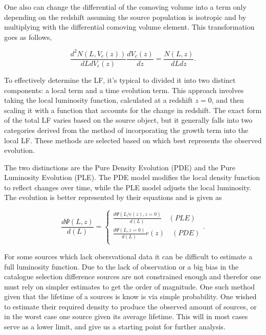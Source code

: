 One also can change the differential of the comoving volume into a term only depending on the redshift assuming the source population is isotropic and by multiplying with the differential comoving volume element. This 
transformation goes as follows, 

\begin{equation}
    \frac{d^2N(L,V_c(z))}{dLdV_c(z)}\frac{dV_c(z)}{dz} = \frac{N(L,z)}{dLdz}.
\end{equation}


To effectively determine the LF, it's typical to divided it into two distinct components: a local term and a time evolution term.
 This approach involves taking the local luminosity function, calculated at a redshift 
$z=0$, and then scaling it with a function that accounts for the change in redshift. 
The exact form of the total LF varies based on the source object, but it generally falls into two categories derived from the method of incorporating the growth term into the local LF.
 These methods are selected based on which best represents the observed evolution.

 The two distinctions are the Pure Density Evolution (PDE) and the Pure Luminosity Evolution (PLE). 
 The PDE model modifies the local density function to reflect changes over time, 
 while the PLE model adjusts the local luminosity. The evolution is better represented by their equations and is given as 

 \begin{equation}\frac{d\Psi(L,z)}{d(L)} = 
    \begin{cases}
        \frac{d\Psi(L/e(z),z=0)}{d(L)} \quad (PLE)\\
        \frac{d\Psi(L,z=0)}{d(L)}e(z) \quad (PDE)\\
    \end{cases}
    .
\end{equation}


For some sources which lack obersvational data it can be difficult to estimate a full luminosity function. Due to the lack of observation or a big bias in the catalogue selection difference sources are not constrained enough and therefor one must rely on simpler estimates to get the order of magnitude. One such method given that the lifetime of a sources is know is via simple probability. One wished to estimate their required density to produce the observed amount of sources, or in the worst case one source given its average lifetime. This will in most cases serve as a lower limit, and give us a starting point for further analysis.  

